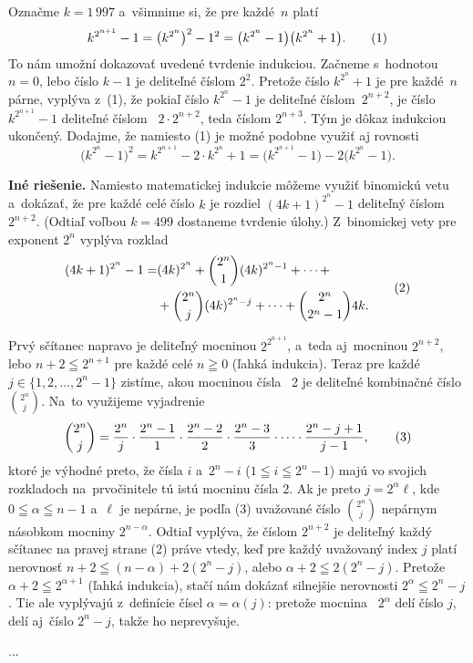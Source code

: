 ﻿{%
Označme $k=1\,997$ a~všimnime si, že pre každé~$n$ platí
$$
k^{2^{n+1}}-1=\bigl(k^{2^{n}}\bigr)^2-1^2=
\bigl(k^{2^{n}}-1\bigr)\bigl(k^{2^{n}}+1\bigr).
\tag 1$$
To nám umožní dokazovať uvedené tvrdenie indukciou.
Začneme s~hodnotou $n=0$, lebo číslo $k-1$ je deliteľné
číslom $2^2$. Pretože číslo $k^{2^{n}}+1$ je pre každé~$n$ párne,
vyplýva z~(1), že pokiaľ číslo $k^{2^{n}}-1$ je deliteľné
číslom~$2^{n+2}$, je číslo $k^{2^{n+1}}-1$ deliteľné čís\-lom~
$2\cdot2^{n+2}$, teda číslom $2^{n+3}$. Tým je dôkaz indukciou
ukončený. Dodajme, že namiesto (1) je možné podobne využiť aj rovnosti
$$
\bigl(k^{2^{n}}-1\bigr)^2=k^{2^{n+1}}-2\cdot k^{2^{n}}+1=
\bigl(k^{2^{n+1}}-1\bigr)-2\bigl(k^{2^{n}}-1\bigr).
$$

\medskip
{\bf Iné riešenie.}
Namiesto matematickej indukcie môžeme využiť binomickú vetu
a~dokázať, že  pre každé celé číslo $k$ je rozdiel $(4k+1)^{2^n}-1$
deliteľný číslom~ $2^{n+2}$. (Odtiaľ voľbou $k=499$
dostaneme tvrdenie úlohy.) Z~binomickej vety pre exponent $2^n$
vyplýva rozklad
$$
\aligned
(4k+1)^{2^n}-1=&(4k)^{2^n}+\binom{2^n}{1}(4k)^{2^n-1}+\dots+\\
&+\binom{2^n}{j}(4k)^{2^n-j}+\dots+\binom{2^n}{2^n-1}4k.
\endaligned
\tag 2
$$

Prvý sčítanec napravo je deliteľný mocninou $2^{2^{n+1}}$,
a~teda aj~mocninou $2^{n+2}$, lebo $n+2\leqq2^{n+1}$ pre každé celé
$n\geqq0$ (ľahká indukcia). Teraz pre každé $j\in\{1,2,\dots,2^n-1\}$
zistíme, akou mocninou čísla~ 2 je deliteľné kombinačné
číslo~$\binom{2^n}{j}$. Na~to využijeme vyjadrenie
$$
\binom{2^n}{j}=\frac{2^n}{j}\cdot\frac{2^n-1}{1}\cdot
\frac{2^n-2}{2}\cdot\frac{2^n-3}{3}\cdot\dots\cdot\frac{2^n-j+1}{j-1},
\tag 3
$$
ktoré je výhodné preto, že čísla $i$ a~$2^n-i$
($1\leqq i\leqq2^n-1$) majú vo svojich
rozkladoch na~prvočinitele tú istú mocninu čísla 2.
Ak je preto $j=2^{\alpha}\ell$, kde
$0\leqq\alpha\leqq n-1$ a~$\ell$ je nepárne, je podľa (3) uvažované
číslo $\binom{2^n}{j}$ nepárnym násobkom mocniny $2^{n-\alpha}$.
Odtiaľ vyplýva, že číslom $2^{n+2}$ je deliteľný každý sčítanec na
pravej strane (2) práve vtedy, keď pre každý uvažovaný index $j$ platí
nerovnosť $n+2\leqq(n-\alpha)+2(2^n-j)$, alebo
$\alpha+2\leqq2(2^n-j)$. Pretože $\alpha+2\leqq2^{\alpha+1}$
(ľahká indukcia), stačí nám dokázať silnejšie nerovnosti
$2^{\alpha}\leqq2^n-j$. Tie ale vyplývajú z~definície čísel
$\alpha=\alpha(j)$: pretože moc\-ni\-na~ $2^{\alpha}$ delí číslo $j$,
delí aj~číslo $2^n-j$, takže ho neprevyšuje.
}

{%
...}

